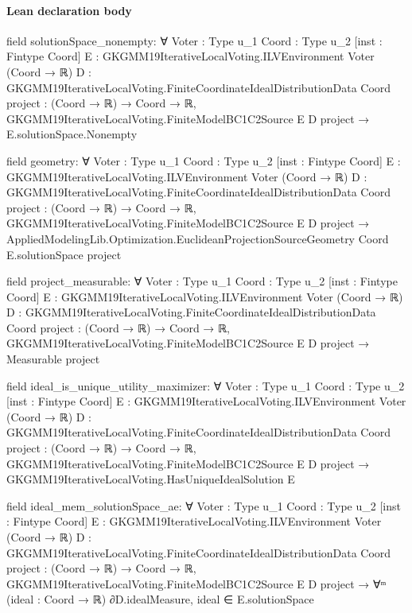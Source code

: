 \documentclass[10pt]{article}
\begin{document}
\paragraph{Lean declaration body}
\begin{ReviewVerbatim}
field solutionSpace_nonempty:
∀ {Voter : Type u_1} {Coord : Type u_2} [inst : Fintype Coord]
  {E : GKGMM19IterativeLocalVoting.ILVEnvironment Voter (Coord → ℝ)}
  {D : GKGMM19IterativeLocalVoting.FiniteCoordinateIdealDistributionData Coord} {project : (Coord → ℝ) → Coord → ℝ},
  GKGMM19IterativeLocalVoting.FiniteModelBC1C2Source E D project → E.solutionSpace.Nonempty

field geometry:
∀ {Voter : Type u_1} {Coord : Type u_2} [inst : Fintype Coord]
  {E : GKGMM19IterativeLocalVoting.ILVEnvironment Voter (Coord → ℝ)}
  {D : GKGMM19IterativeLocalVoting.FiniteCoordinateIdealDistributionData Coord} {project : (Coord → ℝ) → Coord → ℝ},
  GKGMM19IterativeLocalVoting.FiniteModelBC1C2Source E D project →
    AppliedModelingLib.Optimization.EuclideanProjectionSourceGeometry Coord E.solutionSpace project

field project_measurable:
∀ {Voter : Type u_1} {Coord : Type u_2} [inst : Fintype Coord]
  {E : GKGMM19IterativeLocalVoting.ILVEnvironment Voter (Coord → ℝ)}
  {D : GKGMM19IterativeLocalVoting.FiniteCoordinateIdealDistributionData Coord} {project : (Coord → ℝ) → Coord → ℝ},
  GKGMM19IterativeLocalVoting.FiniteModelBC1C2Source E D project → Measurable project

field ideal_is_unique_utility_maximizer:
∀ {Voter : Type u_1} {Coord : Type u_2} [inst : Fintype Coord]
  {E : GKGMM19IterativeLocalVoting.ILVEnvironment Voter (Coord → ℝ)}
  {D : GKGMM19IterativeLocalVoting.FiniteCoordinateIdealDistributionData Coord} {project : (Coord → ℝ) → Coord → ℝ},
  GKGMM19IterativeLocalVoting.FiniteModelBC1C2Source E D project → GKGMM19IterativeLocalVoting.HasUniqueIdealSolution E

field ideal_mem_solutionSpace_ae:
∀ {Voter : Type u_1} {Coord : Type u_2} [inst : Fintype Coord]
  {E : GKGMM19IterativeLocalVoting.ILVEnvironment Voter (Coord → ℝ)}
  {D : GKGMM19IterativeLocalVoting.FiniteCoordinateIdealDistributionData Coord} {project : (Coord → ℝ) → Coord → ℝ},
  GKGMM19IterativeLocalVoting.FiniteModelBC1C2Source E D project →
    ∀ᵐ (ideal : Coord → ℝ) ∂D.idealMeasure, ideal ∈ E.solutionSpace
\end{ReviewVerbatim}
\end{document}
